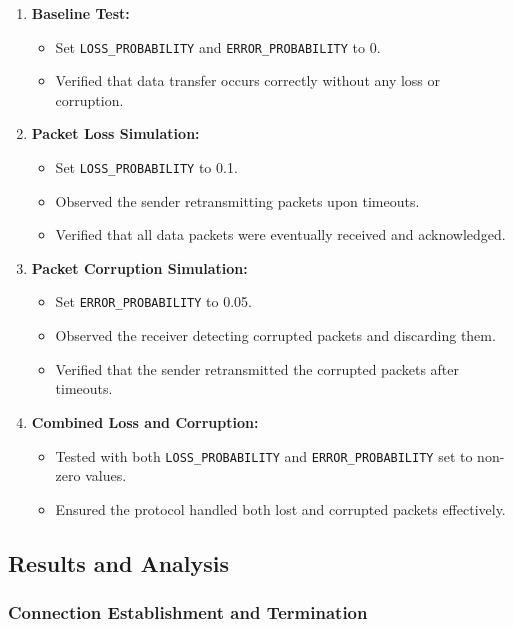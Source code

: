 \documentclass[11pt]{article}
\begin{document}
\begin{enumerate}
    \item \textbf{Baseline Test:}
    \begin{itemize}
        \item Set \texttt{LOSS\_PROBABILITY} and \texttt{ERROR\_PROBABILITY} to 0.
        \item Verified that data transfer occurs correctly without any loss or corruption.
    \end{itemize}
    \item \textbf{Packet Loss Simulation:}
    \begin{itemize}
        \item Set \texttt{LOSS\_PROBABILITY} to 0.1.
        \item Observed the sender retransmitting packets upon timeouts.
        \item Verified that all data packets were eventually received and acknowledged.
    \end{itemize}
    \item \textbf{Packet Corruption Simulation:}
    \begin{itemize}
        \item Set \texttt{ERROR\_PROBABILITY} to 0.05.
        \item Observed the receiver detecting corrupted packets and discarding them.
        \item Verified that the sender retransmitted the corrupted packets after timeouts.
    \end{itemize}
    \item \textbf{Combined Loss and Corruption:}
    \begin{itemize}
        \item Tested with both \texttt{LOSS\_PROBABILITY} and \texttt{ERROR\_PROBABILITY} set to non-zero values.
        \item Ensured the protocol handled both lost and corrupted packets effectively.
    \end{itemize}
\end{enumerate}

\subsection{Results and Analysis}

\subsubsection{Connection Establishment and Termination}
\end{document}
